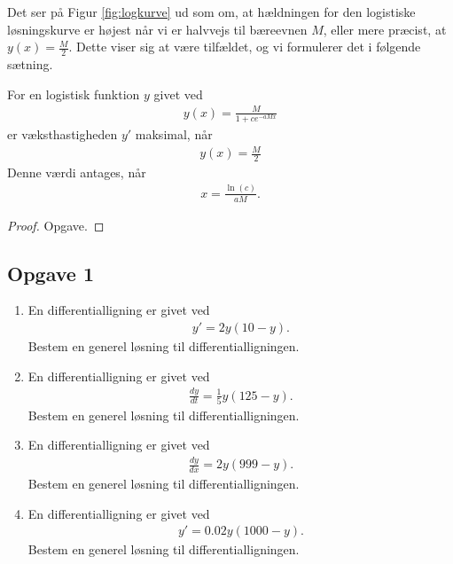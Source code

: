 Det ser på Figur \ref{fig:logkurve} ud som om, at hældningen for den logistiske løsningskurve er højest når vi er halvvejs til bæreevnen $M$, eller mere præcist, at $y(x) = \frac{M}{2}$. Dette viser sig at være tilfældet, og vi formulerer det i følgende sætning. 
\begin{setn}\label{setn:maksvaekst}
	For en logistisk funktion $y$ givet ved
	\begin{align*}
		y(x) = \frac{M}{1+ce^{-aMx}}
	\end{align*}
	er væksthastigheden $y'$ maksimal, når 
	\begin{align*}
		y(x) = \frac{M}{2}
	\end{align*}
	Denne værdi antages, når 
	\begin{align*}
		x = \frac{\ln(c)}{aM}.
	\end{align*}
\end{setn}
\begin{proof}
	Opgave.
\end{proof}

\newpage
\subsection*{Opgave 1}
\begin{enumerate}[label=\roman*)]
	\item En differentialligning er givet ved
	\begin{align*}
		y' = 2y(10-y).
	\end{align*}
	Bestem en generel løsning til differentialligningen. 
	\item En differentialligning er givet ved
	\begin{align*}
		\frac{dy}{dt} = \frac{1}{5}y(125-y).
	\end{align*}
	Bestem en generel løsning til differentialligningen. 
	\item En differentialligning er givet ved
	\begin{align*}
		\frac{dy}{dx} = 2y(999-y).
	\end{align*}
	Bestem en generel løsning til differentialligningen. 
	\item En differentialligning er givet ved
	\begin{align*}
		y' = 0.02y(1000-y).
	\end{align*}
	Bestem en generel løsning til differentialligningen. 
\end{enumerate}

